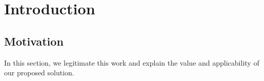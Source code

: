 \chapter{Introduction}
\label{sec:introduction}

\section{Motivation}
In this section, we legitimate this work and explain the value and applicability of our proposed solution.
